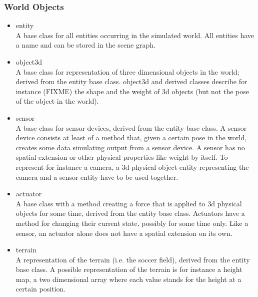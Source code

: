 \documentclass[a4paper,12pt]{article}
\begin{document}
\subsubsection{World Objects}

\begin{itemize}
\item entity\\
  A base class for all entities occurring in the simulated world. All
  entities have a name and can be stored in the scene graph.

\item object3d\\
  A base class for representation of three dimensional objects in the
  world; derived from the entity base class. object3d and derived
  classes describe for instance (FIXME) the shape and the weight of 3d
  objects (but not the pose of the object in the world).
  
\item sensor\\
  A base class for sensor devices, derived from the entity base class.
  A sensor device consists at least of a method that, given a certain
  pose in the world, creates some data simulating output from a sensor
  device. A sensor has no spatial extension or other physical
  properties like weight by itself. To represent for instance a
  camera, a 3d physical object entity representing the camera and a
  sensor entity have to be used together.
  
\item actuator\\
  A base class with a method creating a force that is applied to 3d
  physical objects for some time, derived from the entity base class.
  Actuators have a method for changing their current state, possibly
  for some time only. Like a sensor, an actuator alone does not have a
  spatial extension on its own.
  
\item terrain \\
  A representation of the terrain (i.e. the soccer field), derived
  from the entity base class. A possible representation of the terrain
  is for instance a height map, a two dimensional array where each
  value stands for the height at a certain position.
\end{itemize}




\end{document}
